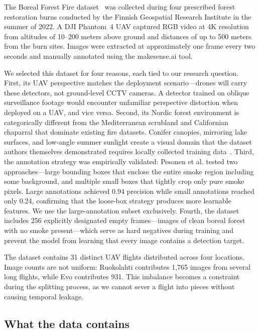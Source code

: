 \documentclass[10pt,twocolumn]{article}
\begin{document}
The Boreal Forest Fire dataset~\cite{pesonen2025boreal} was collected during four prescribed forest restoration burns conducted by the Finnish Geospatial Research Institute in the summer of 2022. A DJI Phantom~4 UAV captured RGB video at 4K resolution from altitudes of 10--200 meters above ground and distances of up to 500 meters from the burn sites. Images were extracted at approximately one frame every two seconds and manually annotated using the makesense.ai tool.

We selected this dataset for four reasons, each tied to our research question. First, its UAV perspective matches the deployment scenario---drones will carry these detectors, not ground-level CCTV cameras. A detector trained on oblique surveillance footage would encounter unfamiliar perspective distortion when deployed on a UAV, and vice versa. Second, its Nordic forest environment is categorically different from the Mediterranean scrubland and Californian chaparral that dominate existing fire datasets. Conifer canopies, mirroring lake surfaces, and low-angle summer sunlight create a visual domain that the dataset authors themselves demonstrated requires locally collected training data~\cite{raita2023combining}. Third, the annotation strategy was empirically validated: Pesonen et al. tested two approaches---large bounding boxes that enclose the entire smoke region including some background, and multiple small boxes that tightly crop only pure smoke pixels. Large annotations achieved 0.94 precision while small annotations reached only 0.24, confirming that the loose-box strategy produces more learnable features. We use the large-annotation subset exclusively. Fourth, the dataset includes 256 explicitly designated empty frames---images of clean boreal forest with no smoke present---which serve as hard negatives during training and prevent the model from learning that every image contains a detection target.

The dataset contains 31 distinct UAV flights distributed across four locations. Image counts are not uniform: Ruokolahti contributes 1,765 images from several long flights, while Evo contributes 931. This imbalance becomes a constraint during the splitting process, as we cannot sever a flight into pieces without causing temporal leakage.

\subsection{What the data contains}
\end{document}

